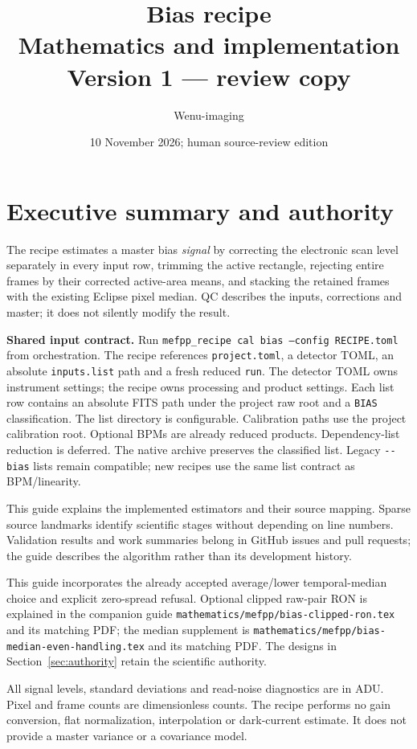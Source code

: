 \documentclass[11pt,a4paper]{article}
\title{\vspace{-10mm}Bias recipe\\Mathematics and implementation\\\large Version 1 --- review copy}
\author{Wenu-imaging}\date{10 November 2026; human source-review edition}
\newcommand{\code}[1]{\nolinkurl{#1}}
\begin{document}
\maketitle\vspace{-6mm}
\section{Executive summary and authority}
The recipe estimates a master bias \emph{signal} by correcting the electronic
scan level separately in every input row, trimming the active rectangle,
rejecting entire frames by their corrected active-area means, and stacking the
retained frames with the existing Eclipse pixel median. QC describes the
inputs, corrections and master; it does not silently modify the result.

\textbf{Shared input contract.} Run \texttt{mefpp\_recipe cal bias --config RECIPE.toml}
from orchestration. The recipe references \code{project.toml}, a detector TOML,
an absolute \code{inputs.list} path and a fresh reduced \code{run}. The detector
TOML owns instrument settings; the recipe owns processing and product settings.
Each list row
contains an absolute FITS path under the project raw root and a \code{BIAS}
classification. The list directory is configurable. Calibration paths use the
project calibration root.
Optional BPMs are already reduced products. Dependency-list reduction is deferred.
The native archive preserves the classified list. Legacy \code{--bias} lists
remain compatible; new recipes use the same list contract as BPM/linearity.

This guide explains the implemented estimators and their source mapping.
Sparse source landmarks identify scientific stages without depending on line
numbers. Validation results and work summaries belong in GitHub issues and
pull requests; the guide describes the algorithm rather than its development
history.

This guide incorporates the already accepted average/lower temporal-median
choice and explicit zero-spread refusal. Optional clipped raw-pair RON is
explained in the companion guide \code{mathematics/mefpp/bias-clipped-ron.tex}
and its matching PDF; the median supplement is
\code{mathematics/mefpp/bias-median-even-handling.tex} and its matching PDF.
The designs in Section~\ref{sec:authority} retain the scientific authority.

All signal levels, standard deviations and read-noise diagnostics are in ADU.
Pixel and frame counts are dimensionless counts. The recipe performs no gain
conversion, flat normalization, interpolation or dark-current estimate.
It does not provide a master variance or a covariance model.
\end{document}
